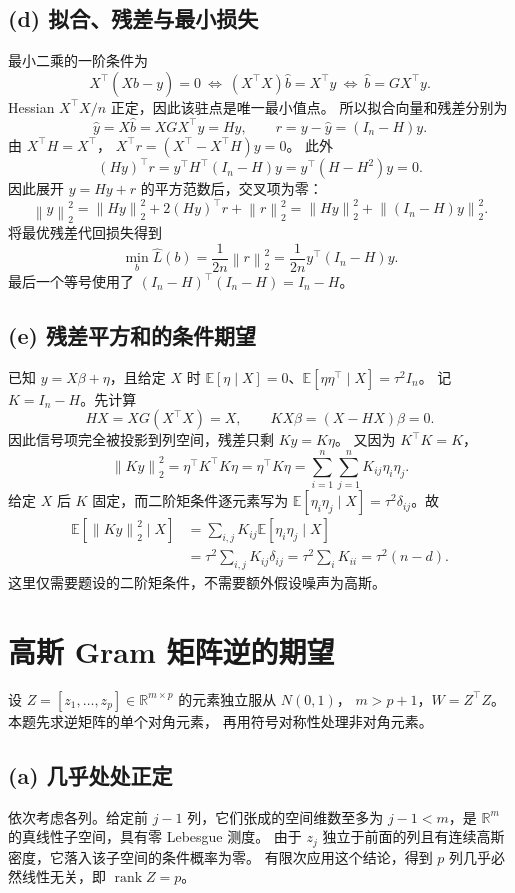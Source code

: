 \documentclass[UTF8,a4paper,11pt,fontset=fandol]{ctexart}
\newcommand{\E}{\mathbb E}
\newcommand{\R}{\mathbb R}
\newcommand{\norm}[1]{\left\lVert#1\right\rVert}
\DeclareMathOperator{\rank}{rank}
\begin{document}
\subsection*{(d) 拟合、残差与最小损失}
最小二乘的一阶条件为
\[
 X^\top(X\widehat b-y)=0
 \ \Longleftrightarrow\ (X^\top X)\widehat b=X^\top y
 \ \Longleftrightarrow\ \widehat b=GX^\top y.
\]
Hessian $X^\top X/n$ 正定，因此该驻点是唯一最小值点。
所以拟合向量和残差分别为
\[
 \widehat y=X\widehat b=XGX^\top y=Hy,
 \qquad r=y-\widehat y=(I_n-H)y.
\]
由 $X^\top H=X^\top$，
$X^\top r=(X^\top-X^\top H)y=0$。
此外
\[
 (Hy)^\top r=y^\top H^\top(I_n-H)y
 =y^\top(H-H^2)y=0.
\]
因此展开 $y=Hy+r$ 的平方范数后，交叉项为零：
\[
 \norm y_2^2=\norm{Hy}_2^2+2(Hy)^\top r+\norm r_2^2
 =\norm{Hy}_2^2+\norm{(I_n-H)y}_2^2.
\]
将最优残差代回损失得到
\[
 \boxed{\min_b\widehat L(b)=\frac1{2n}\norm r_2^2
 =\frac1{2n}y^\top(I_n-H)y.}
\]
最后一个等号使用了 $(I_n-H)^\top(I_n-H)=I_n-H$。

\subsection*{(e) 残差平方和的条件期望}
已知 $y=X\beta+\eta$，且给定 $X$ 时
$\E[\eta\mid X]=0$、$\E[\eta\eta^\top\mid X]=\tau^2I_n$。
记 $K=I_n-H$。先计算
\[
 HX=XG(X^\top X)=X,
 \qquad KX\beta=(X-HX)\beta=0.
\]
因此信号项完全被投影到列空间，残差只剩 $Ky=K\eta$。
又因为 $K^\top K=K$，
\[
 \norm{Ky}_2^2=\eta^\top K^\top K\eta=\eta^\top K\eta
 =\sum_{i=1}^n\sum_{j=1}^nK_{ij}\eta_i\eta_j.
\]
给定 $X$ 后 $K$ 固定，而二阶矩条件逐元素写为
$\E[\eta_i\eta_j\mid X]=\tau^2\delta_{ij}$。故
\begin{align*}
 \E[\norm{Ky}_2^2\mid X]
 &=\sum_{i,j}K_{ij}\E[\eta_i\eta_j\mid X]\\
 &=\tau^2\sum_{i,j}K_{ij}\delta_{ij}
 =\tau^2\sum_iK_{ii}
 =\boxed{\tau^2(n-d)}.
\end{align*}
这里仅需要题设的二阶矩条件，不需要额外假设噪声为高斯。

\section{高斯 Gram 矩阵逆的期望}
设 $Z=[z_1,\ldots,z_p]\in\R^{m\times p}$ 的元素独立服从 $N(0,1)$，
$m>p+1$，$W=Z^\top Z$。本题先求逆矩阵的单个对角元素，
再用符号对称性处理非对角元素。

\subsection*{(a) 几乎处处正定}
依次考虑各列。给定前 $j-1$ 列，它们张成的空间维数至多为
$j-1<m$，是 $\R^m$ 的真线性子空间，具有零 Lebesgue 测度。
由于 $z_j$ 独立于前面的列且有连续高斯密度，它落入该子空间的条件概率为零。
有限次应用这个结论，得到 $p$ 列几乎必然线性无关，即 $\rank Z=p$。
\end{document}

